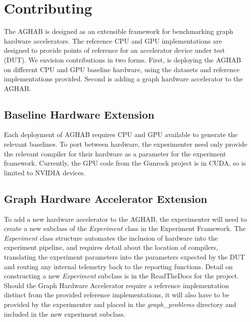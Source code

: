 \section{Contributing}\label{section:contributing}
The AGHAB is designed as an extensible framework for benchmarking graph hardware accelerators. 
The reference CPU and GPU implementations are designed to provide points of reference for an accelerator device under test (DUT). 
We envision contributions in two forms. 
First, is deploying the AGHAB on different CPU and GPU baseline hardware, using the datasets and reference implementations provided. 
Second is adding a graph hardware accelerator to the AGHAB. 

\subsection{Baseline Hardware Extension}
Each deployment of AGHAB requires CPU and GPU available to generate the relevant baselines. 
To port between hardware, the experimenter need only provide the relevant compiler for their hardware as a parameter for the experiment framework. 
Currently, the GPU code from the Gunrock project is in CUDA, so is limited to NVIDIA devices.

\subsection{Graph Hardware Accelerator Extension}
To add a new hardware accelerator to the AGHAB, the experimenter will need to create a new subclass of the \textit{Experiment} class in the Experiment Framework. 
The \textit{Experiment} class structure automates the inclusion of hardware into the experiment pipeline, and requires detail about the location of compilers, translating the experiment parameters into the parameters expected by the DUT and routing any internal telemetry back to the reporting functions. 
Detail on constructing a new \textit{Experiment} subclass is in the ReadTheDocs for the project.
Should the Graph Hardware Accelerator require a reference implementation distinct from the provided reference implementations, it will also have to be provided by the experimenter and placed in the \textit{graph\_problems} directory and included in the new experiment subclass.
